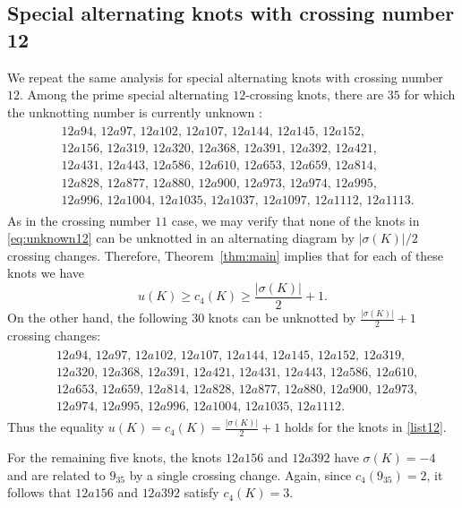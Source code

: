 \documentclass[a4paper,11pt]{amsart}
\theoremstyle{definition}
\theoremstyle{remark}
\numberwithin{equation}{section}
\begin{document}
\subsection{Special alternating knots with crossing number 12}
We repeat the same analysis for special alternating knots with crossing number $12$.
Among the prime special alternating $12$-crossing knots, there are $35$ for which the unknotting number is currently unknown \cite{knotinfo}:
\begin{align}\begin{split}\label{eq:unknown12}
&12a94,\, 12a97,\, 12a102,\, 12a107,\, 12a144,\, 12a145,\, 12a152,\\
&12a156,\, 12a319,\, 12a320,\, 12a368,\, 12a391,\, 12a392,\, 12a421,\\
&12a431,\, 12a443,\, 12a586,\, 12a610,\, 12a653,\, 12a659,\, 12a814,\\
&12a828,\, 12a877,\, 12a880,\, 12a900,\, 12a973,\, 12a974,\, 12a995,\\
&12a996,\, 12a1004,\, 12a1035,\, 12a1037,\, 12a1097,\, 12a1112,\, 12a1113.
\end{split}\end{align}
As in the crossing number $11$ case, we may verify that none of the knots in \eqref{eq:unknown12} can be unknotted in an alternating diagram by $\lvert\sigma(K)\rvert/2$ crossing changes.
Therefore, Theorem~\ref{thm:main} implies that for each of these knots we have
\[
u(K)\ge c_4(K)\ge \frac{\lvert\sigma(K)\rvert}{2}+1.
\]
On the other hand, the following $30$ knots can be unknotted by $\frac{|\sigma(K)|}{2}+1$ crossing changes:
\begin{align}\begin{split}\label{list12}
&12a94,\, 12a97,\, 12a102,\, 12a107,\, 12a144,\, 12a145,\, 12a152,\, 12a319,\\
&12a320,\, 12a368,\, 12a391,\, 12a421,\, 12a431,\, 12a443,\, 12a586,\, 12a610,\\
&12a653,\, 12a659,\, 12a814,\, 12a828,\, 12a877,\, 12a880,\, 12a900,\, 12a973,\\
&12a974,\, 12a995,\, 12a996,\, 12a1004,\, 12a1035,\, 12a1112.
\end{split}\end{align}
Thus the equality $u(K)=c_4(K)=\frac{|\sigma(K)|}{2}+1$ holds for the knots in \eqref{list12}.


For the remaining five knots, the knots $12a156$ and $12a392$ have $\sigma(K)=-4$ and are related to $9_{35}$ by a single crossing change. Again, since $c_4(9_{35})=2$, it follows that $12a156$ and $12a392$ satisfy $c_4(K)=3$.
\end{document}
